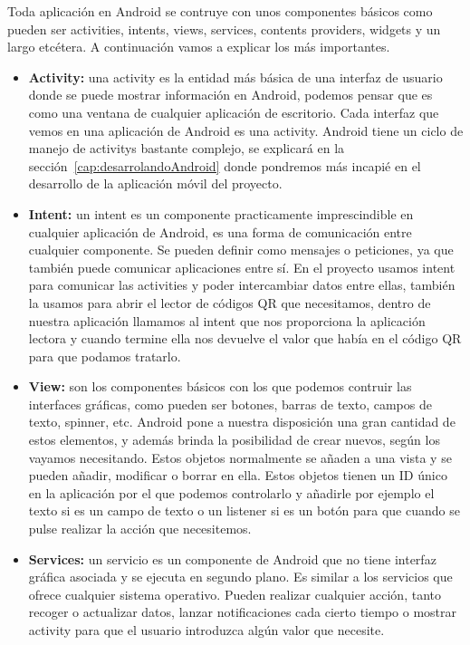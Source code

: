 Toda aplicación en Android se contruye con unos componentes básicos como pueden ser activities, intents, views, services, contents providers, widgets y un largo etcétera. A continuación vamos a explicar los más importantes.

\begin{itemize}

\item \textbf{Activity:} una activity es la entidad más básica de una interfaz de usuario donde se puede mostrar información en Android, podemos pensar que es como una ventana de cualquier aplicación de escritorio. Cada interfaz que vemos en una aplicación de Android es una activity. Android tiene un ciclo de manejo de activitys bastante complejo, se explicará en la sección~\ref{cap:desarrolandoAndroid} donde pondremos más incapié en el desarrollo de la aplicación móvil del proyecto.

\item \textbf{Intent:} un intent es un componente practicamente imprescindible en cualquier aplicación de Android, es una forma de comunicación entre cualquier componente. Se pueden definir como mensajes o peticiones, ya que también puede comunicar aplicaciones entre sí. En el proyecto usamos intent para comunicar las activities y poder intercambiar datos entre ellas, también la usamos para abrir el lector de códigos QR que necesitamos, dentro de nuestra aplicación llamamos al intent que nos proporciona la aplicación lectora y cuando termine ella nos devuelve el valor que había en el código QR para que podamos tratarlo.

\item \textbf{View:} son los componentes básicos con los que podemos contruir las interfaces gráficas, como pueden ser botones, barras de texto, campos de texto, spinner, etc. Android pone a nuestra disposición una gran cantidad de estos elementos, y además brinda la posibilidad de crear nuevos, según los vayamos necesitando. Estos objetos normalmente se añaden a una vista y se pueden añadir, modificar o borrar en ella. Estos objetos tienen un ID único en la aplicación por el que podemos controlarlo y añadirle por ejemplo el texto si es un campo de texto o un listener si es un botón para que cuando se pulse realizar la acción que necesitemos.

\item \textbf{Services:} un servicio es un componente de Android que no tiene interfaz gráfica asociada y se ejecuta en segundo plano. Es similar a los servicios que ofrece cualquier sistema operativo. Pueden realizar cualquier acción, tanto recoger o actualizar datos, lanzar notificaciones cada cierto tiempo o mostrar activity para que el usuario introduzca algún valor que necesite.


\end{itemize}
